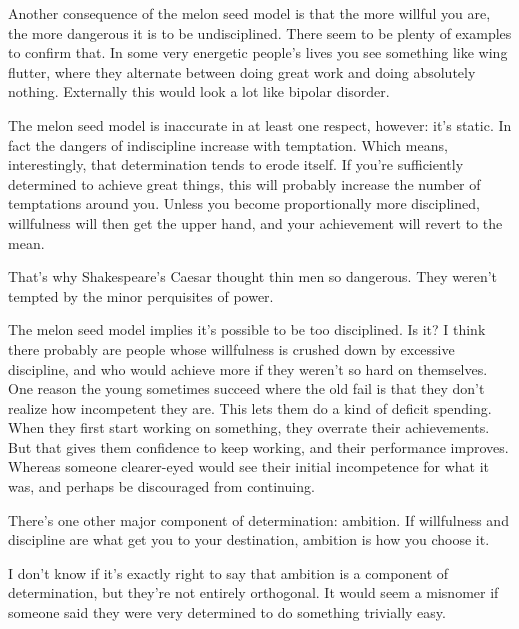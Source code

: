 \documentclass[12pt]{book}
\begin{document}
Another consequence of the melon seed model is that the more willful you
are, the more dangerous it is to be undisciplined. There seem to be
plenty of examples to confirm that. In some very energetic people's
lives you see something like wing flutter, where they alternate between
doing great work and doing absolutely nothing. Externally this would
look a lot like bipolar disorder.

The melon seed model is inaccurate in at least one respect, however:
it's static. In fact the dangers of indiscipline increase with
temptation. Which means, interestingly, that determination tends to
erode itself. If you're sufficiently determined to achieve great things,
this will probably increase the number of temptations around you. Unless
you become proportionally more disciplined, willfulness will then get
the upper hand, and your achievement will revert to the mean.

That's why Shakespeare's Caesar thought thin men so dangerous. They
weren't tempted by the minor perquisites of power.

The melon seed model implies it's possible to be too disciplined. Is it?
I think there probably are people whose willfulness is crushed down by
excessive discipline, and who would achieve more if they weren't so hard
on themselves. One reason the young sometimes succeed where the old fail
is that they don't realize how incompetent they are. This lets them do a
kind of deficit spending. When they first start working on something,
they overrate their achievements. But that gives them confidence to keep
working, and their performance improves. Whereas someone clearer-eyed
would see their initial incompetence for what it was, and perhaps be
discouraged from continuing.

There's one other major component of determination: ambition. If
willfulness and discipline are what get you to your destination,
ambition is how you choose it.

I don't know if it's exactly right to say that ambition is a component
of determination, but they're not entirely orthogonal. It would seem a
misnomer if someone said they were very determined to do something
trivially easy.
\end{document}
